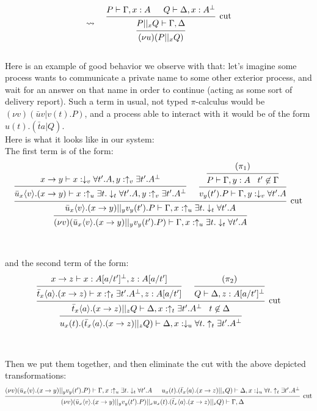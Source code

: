 \documentclass[a4paper,12pt]{article}
\begin{document}
\[\leadsto\;\;\;\;\begin{prooftree}
		\hypo{P \vdash \Gamma,x:A}
		\hypo{Q \vdash \Delta,x:A^\bot}
	\infer2[cut]{P||_xQ \vdash \Gamma,\Delta}
\infer1{(\nu u)(P ||_x Q)}
\end{prooftree}\]
~\\
Here is an example of good behavior we observe with that: let's imagine some process wants to communicate a private name to some other exterior process, and wait for an answer on that name in order to continue (acting as some sort of delivery report). Such a term in usual, not typed $\pi$-calculus would be $(\nu v)(\bar{u}v | v(t).P)$, and a process able to interact with it would be of the form $u(t).(\bar{t}a|Q)$.\\
Here is what it looks like in our system:\\
The first term is of the form:
\[\begin{prooftree}
				\hypo{x\to y \vdash x:\downarrow_v\forall t'.A, y:\uparrow_v\exists t'.A^\bot}
			\infer1{\bar{u}_x\langle v\rangle.(x\to y) \vdash x:\uparrow_u\exists t.\downarrow_t\forall t'.A, y:\uparrow_v\exists t'.A^\bot}
					\hypo{(\pi_1)}
				\infer1{P \vdash \Gamma, y:A\;\;\; t' \not\in \Gamma}
			\infer1{v_y(t').P \vdash \Gamma, y:\downarrow_v\forall t'.A}
		\infer2[cut]{\bar{u}_x\langle v\rangle.(x\to y) ||_y v_y(t').P \vdash \Gamma, x:\uparrow_u\exists t.\downarrow_t\forall t'.A}
	\infer1{(\nu v)(\bar{u}_x\langle v\rangle.(x\to y) ||_y v_y(t').P) \vdash \Gamma, x:\uparrow_u\exists t.\downarrow_t\forall t'.A}
\end{prooftree}\]
~\\~\\
and the second term of the form:
\[\begin{prooftree}
				\hypo{x\to z \vdash x:A[a/t']^\bot, z:A[a/t']}
			\infer1{\bar{t}_x\langle a\rangle.(x\to z) \vdash x:\uparrow_t\exists t'.A^\bot, z:A[a/t']}
				\hypo{(\pi_2)}
			\infer1{Q \vdash \Delta, z:A[a/t']^\bot}
		\infer2[cut]{\bar{t}_x\langle a\rangle.(x\to z) ||_z Q \vdash \Delta, x:\uparrow_t\exists t'.A^\bot\;\;\; t\not\in \Delta}
	\infer1{u_x(t).(\bar{t}_x\langle a\rangle.(x\to z) ||_z Q) \vdash \Delta, x:\downarrow_u\forall t.\uparrow_t\exists t'.A^\bot}
\end{prooftree}\]
~\\~\\
Then we put them together, and then eliminate the cut with the above depicted transformations:
\[\begin{prooftree}
		\hypo{(\nu v)(\bar{u}_x\langle v\rangle.(x\to y) ||_y v_y(t').P) \vdash \Gamma, x:\uparrow_u\exists t.\downarrow_t\forall t'.A}
		\hypo{u_x(t).(\bar{t}_x\langle a\rangle.(x\to z) ||_z Q) \vdash \Delta, x:\downarrow_u\forall t.\uparrow_t\exists t'.A^\bot}
	\infer2[cut]{(\nu v)(\bar{u}_x\langle v\rangle.(x\to y) ||_y v_y(t').P) ||_x u_x(t).(\bar{t}_x\langle a\rangle.(x\to z) ||_z Q) \vdash \Gamma, \Delta}
\end{prooftree}\]~\\~\\
\end{document}
